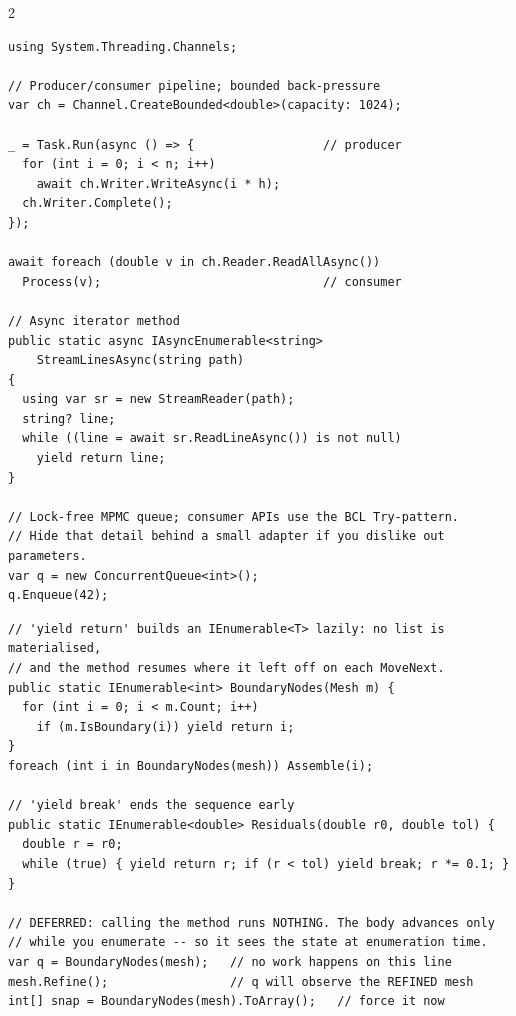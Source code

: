 \documentclass[9pt,a4paper]{extarticle}
\newenvironment{card}[3][acBlue]{%
  \begin{tcolorbox}[
    enhanced, colback=#2, colframe=bdCard,
    coltitle=black, colbacktitle=#2!70!bgHdr,
    fonttitle=\bfseries\fontsize{6.16pt}{7.48pt}\selectfont\MakeUppercase,
    title={#3},
    left=3pt, right=2pt, top=1.4pt, bottom=1.8pt,
    toptitle=1pt, bottomtitle=1pt,
    boxrule=0.4pt,
    borderline west={3pt}{0pt}{#1},
    arc=2pt, before skip=0pt, after skip=1.6mm,
    breakable, toprule at break=0pt, bottomrule at break=0pt,
  ]}{\end{tcolorbox}}
\begin{document}
\begin{multicols}{2}
\begin{card}[acTeal]{bgTeal}{Async Streams \& Channels}
\begin{lstlisting}[style=cs]
using System.Threading.Channels;

// Producer/consumer pipeline; bounded back-pressure
var ch = Channel.CreateBounded<double>(capacity: 1024);

_ = Task.Run(async () => {                  // producer
  for (int i = 0; i < n; i++)
    await ch.Writer.WriteAsync(i * h);
  ch.Writer.Complete();
});

await foreach (double v in ch.Reader.ReadAllAsync())
  Process(v);                               // consumer

// Async iterator method
public static async IAsyncEnumerable<string>
    StreamLinesAsync(string path)
{
  using var sr = new StreamReader(path);
  string? line;
  while ((line = await sr.ReadLineAsync()) is not null)
    yield return line;
}

// Lock-free MPMC queue; consumer APIs use the BCL Try-pattern.
// Hide that detail behind a small adapter if you dislike out parameters.
var q = new ConcurrentQueue<int>();
q.Enqueue(42);
\end{lstlisting}
\end{card}


\begin{card}[acGreen]{bgGreen}{Iterators, \texttt{yield} \& Deferred Execution}
\begin{lstlisting}[style=cs]
// 'yield return' builds an IEnumerable<T> lazily: no list is materialised,
// and the method resumes where it left off on each MoveNext.
public static IEnumerable<int> BoundaryNodes(Mesh m) {
  for (int i = 0; i < m.Count; i++)
    if (m.IsBoundary(i)) yield return i;
}
foreach (int i in BoundaryNodes(mesh)) Assemble(i);

// 'yield break' ends the sequence early
public static IEnumerable<double> Residuals(double r0, double tol) {
  double r = r0;
  while (true) { yield return r; if (r < tol) yield break; r *= 0.1; }
}

// DEFERRED: calling the method runs NOTHING. The body advances only
// while you enumerate -- so it sees the state at enumeration time.
var q = BoundaryNodes(mesh);   // no work happens on this line
mesh.Refine();                 // q will observe the REFINED mesh
int[] snap = BoundaryNodes(mesh).ToArray();   // force it now


\end{lstlisting}
\end{card}
\end{multicols}
\end{document}
